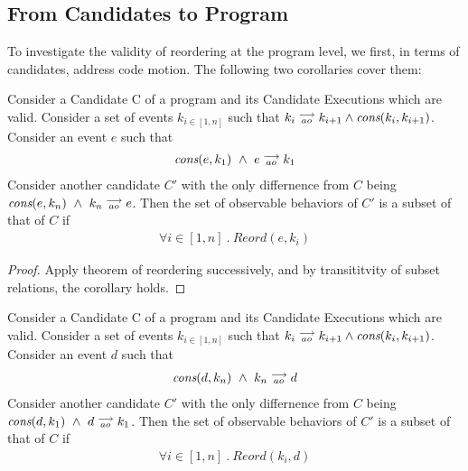 \subsection{From Candidates to Program}

    To investigate the validity of reordering at the program level, we first, in terms of candidates, address code motion. The following two corollaries cover them: 
    \begin{corollary}
        Consider a Candidate C of a program and its Candidate Executions which are valid. Consider a set of events $k_{i \in[1,n]}$ such that $k_i\stackrel{\longrightarrow}{_{ao}}k_{i+1} \wedge \textit{cons}(k_i,k_{i+1})$.
        Consider an event $e$ such that 
        \begin{align}
            \textit{cons}(e,k_1) \ \wedge \ e\stackrel{\longrightarrow}{_{ao}}k_1  
        \end{align}
        Consider another candidate $C'$ with the only differnence from $C$ being $\cons{e}{k_n} \ \wedge \ \reln{k_n}{ao}{e}$.
        Then the set of observable behaviors of $C'$ is a subset of that of $C$ if 
        \begin{align}
            \forall i \in [1,n] \ . \ Reord(e,k_i)
        \end{align} 
    \end{corollary}

    \begin{proof}
        Apply theorem of reordering successively, and by transititvity of subset relations, the corollary holds.
    \end{proof}

    \begin{corollary}
        Consider a Candidate C of a program and its Candidate Executions which are valid. Consider a set of events $k_{i \in[1,n]}$ such that $k_i\stackrel{\longrightarrow}{_{ao}}k_{i+1} \wedge \textit{cons}(k_i,k_{i+1})$.
        Consider an event $d$ such that 
        \begin{align}
            \textit{cons}(d,k_n) \ \wedge \ k_n\stackrel{\longrightarrow}{_{ao}}d  
        \end{align}
        Consider another candidate $C'$ with the only differnence from $C$ being $\cons{d}{k_1} \ \wedge \ \reln{d}{ao}{k_1}$.
        Then the set of observable behaviors of $C'$ is a subset of that of $C$ if 
        \begin{align}
            \forall i \in [1,n] \ . \ Reord(k_i,d)
        \end{align} 
    \end{corollary}

